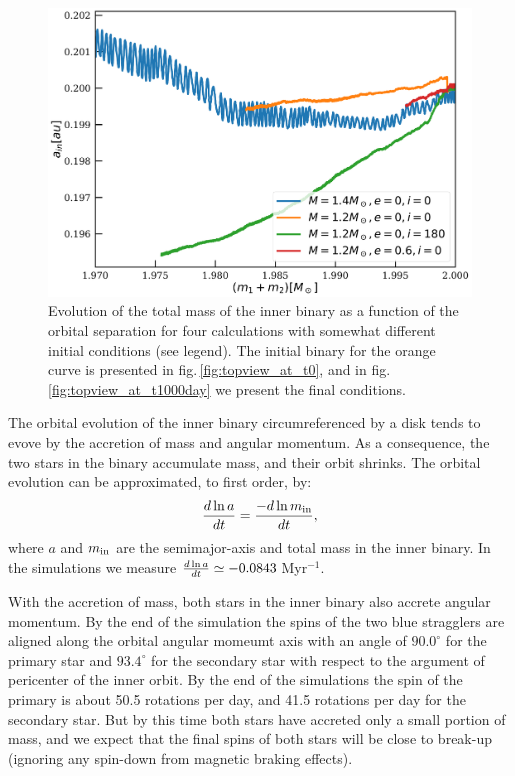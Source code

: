 \documentclass{aastex62}
\begin{document}
\begin{figure}[ht!]
  \includegraphics[width=\columnwidth]{fig_mass_vs_semimajor_axis.pdf}
  \caption{Evolution of the total mass of the inner binary as a
    function of the orbital separation for four calculations with
    somewhat different initial conditions (see legend).  The initial
    binary for the orange curve is presented in
    fig.\,\ref{fig:topview_at_t0}, and in
    fig.\,\ref{fig:topview_at_t1000day} we present the final
    conditions.
\label{fig:mass_vs_semimajor_axis}}
\end{figure}

The orbital evolution of the inner binary circumreferenced by a disk
tends to evove by the accretion of mass and angular momentum. As a
consequence, the two stars in the binary accumulate mass, and their
orbit shrinks. The orbital evolution can be approximated, to first order, by:
\begin{equation}
  {d\ln a \over dt}   = {-d\ln m_{\rm in} \over dt},
\end{equation}
where $a$ and $m_{\rm in}$ are the semimajor-axis and total mass in
the inner binary.  In the simulations we measure ${d\ln a \over dt}
\simeq -0.0843$\,Myr$^{-1}$.

With the accretion of mass, both stars in the inner binary also accrete
angular momentum.  By the end of the simulation the spins of the two
blue stragglers are aligned along the orbital angular momeumt axis with
an angle of $90.0^\circ$ for the primary star and $93.4^\circ$ for the
secondary star with respect to the argument of pericenter of the inner
orbit.  By the end of the simulations the spin of the primary is about
50.5 rotations per day, and 41.5 rotations per day for the secondary star. But by this
time both stars have accreted only a small portion of mass, and we expect that
the final spins of both stars will be close to break-up (ignoring any spin-down from magnetic braking effects).
\end{document}
